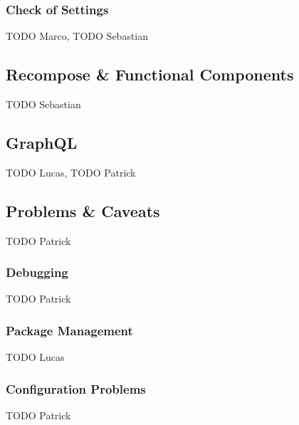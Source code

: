 \subsubsection{Check of Settings}
\label{sssec:poll_check}

TODO Marco, TODO Sebastian

\subsection{Recompose \& Functional Components}
\label{ssec:recompose}

TODO Sebastian

\subsection{GraphQL}
\label{ssec:graphql}

TODO Lucas, TODO Patrick

\subsection{Problems \& Caveats}
\label{ssec:problems}

TODO Patrick

\subsubsection{Debugging}
\label{sssec:debugging}

TODO Patrick

\subsubsection{Package Management}
\label{sssec:package_management}

TODO Lucas

\subsubsection{Configuration Problems}
\label{sssec:configuration_problems}

TODO Patrick